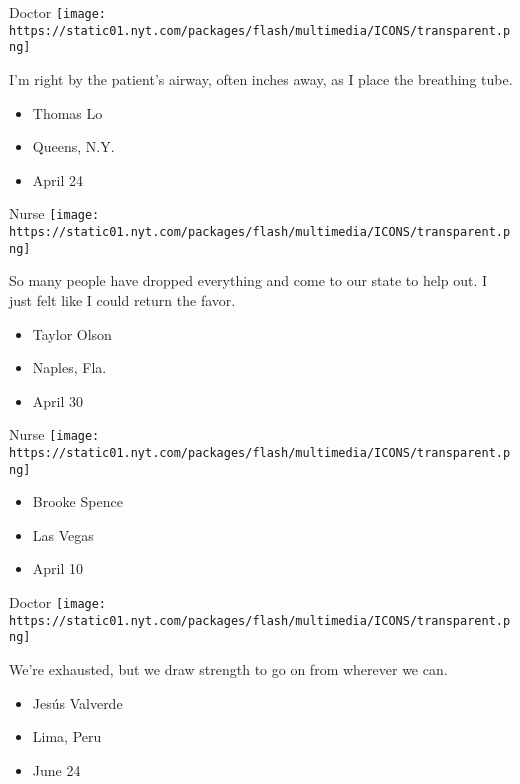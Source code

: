 \protect\hyperlink{item-thomas-lo}{}

Doctor
\texttt{[image: https://static01.nyt.com/packages/flash/multimedia/ICONS/transparent.png]}

I'm right by the patient's airway, often inches away, as I place the
breathing tube.

\begin{itemize}
\tightlist
\item
  Thomas Lo
\item
  Queens, N.Y.
\item
  April 24
\end{itemize}

\protect\hyperlink{item-taylor-olson}{}

Nurse
\texttt{[image: https://static01.nyt.com/packages/flash/multimedia/ICONS/transparent.png]}

So many people have dropped everything and come to our state to help
out. I just felt like I could return the favor.

\begin{itemize}
\tightlist
\item
  Taylor Olson
\item
  Naples, Fla.
\item
  April 30
\end{itemize}

\protect\hyperlink{item-brooke-spence}{}

Nurse
\texttt{[image: https://static01.nyt.com/packages/flash/multimedia/ICONS/transparent.png]}

\begin{itemize}
\tightlist
\item
  Brooke Spence
\item
  Las Vegas
\item
  April 10
\end{itemize}

\protect\hyperlink{item-jesus-valverde}{}

Doctor
\texttt{[image: https://static01.nyt.com/packages/flash/multimedia/ICONS/transparent.png]}

We're exhausted, but we draw strength to go on from wherever we can.

\begin{itemize}
\tightlist
\item
  Jesús Valverde
\item
  Lima, Peru
\item
  June 24
\end{itemize}

